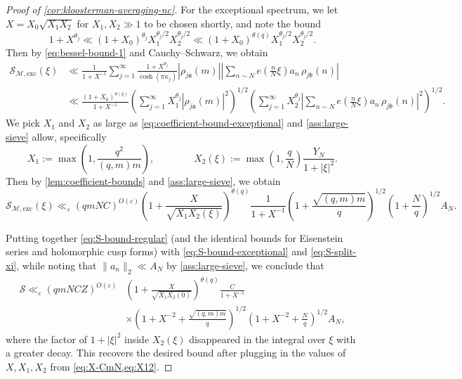 \documentclass[reqno,11pt]{amsart}
\theoremstyle{remark}
\numberwithin{equation}{section}
\newcommand{\mM}{\mathcal{M}}
\newcommand{\mS}{\mathcal{S}}
\newcommand{\ma}{\mathfrak{a}}
\newcommand{\mb}{\mathfrak{b}}
\newcommand{\eps}{\varepsilon}
\begin{document}
\begin{proof}[Proof of \cref{cor:kloosterman-averaging-nc}]
For the exceptional spectrum, we let $X = X_0 \sqrt{X_1 X_2}$ for $X_1, X_2 \gg 1$ to be chosen shortly, and note the bound
\[
    1 + X^{\theta_j} \ll (1 + X_0)^{\theta_j} X_1^{\theta_j/2} X_2^{\theta_j/2} 
    \ll 
    (1 + X_0)^{\theta(q)} X_1^{\theta_j/2} X_2^{\theta_j/2}.
\]
Then by \cref{eq:bessel-bound-1} and Cauchy--Schwarz, we obtain
\begin{equation} \label{eq:exceptional-contribution}
\begin{aligned}
    \mS_{\mM,\text{exc}}(\xi)
    &\ll 
    \frac{1}{1+X^{-1}}
    \sum_{j=1}^\infty \frac{1 + X^{\theta_j}}{\cosh(\pi \kappa_j)} 
    |\rho_{j\ma}(m)| \left\vert \sum_{n \sim N} e\left(\frac{n}{N} \xi\right) a_n\, 
    \rho_{j\mb}(n)\right\vert
    \\
    &\ll
    \frac{(1 + X_0)^{\theta(q)}}{1+X^{-1}}
    \left(
    \sum_{j=1}^\infty X_1^{\theta_j} 
    |\rho_{j\ma}(m)|^2 \right)^{1/2}
    \left( 
    \sum_{j=1}^\infty X_2^{\theta_j} \left\vert \sum_{n \sim N} e\left(\frac{n}{N} \xi\right) a_n\,  
    \rho_{j\mb}(n)\right\vert^2 \right)^{1/2}.
\end{aligned}
\end{equation}
We pick $X_1$ and $X_2$ as large as \cref{eq:coefficient-bound-exceptional} and \cref{ass:large-sieve} allow, specifically
\begin{equation} \label{eq:X12}
    X_1 := \max\left(1, \frac{q^2}{(q,m) m}\right),
    \qquad\qquad 
    X_2(\xi) := \max\left(1, \frac{q}{N}\right) \frac{Y_N}{1 + |\xi|^2}.
\end{equation}
Then by \cref{lem:coefficient-bounds} and \cref{ass:large-sieve}, we obtain
\begin{equation} \label{eq:S-bound-exceptional}
    \mS_{\mM,\text{exc}}(\xi)
    \ll_\eps 
    (qmNC)^{O(\eps)}
    \left(1 + \frac{X}{\sqrt{X_1 X_2(\xi)}} \right)^{\theta(q)}
    \frac{1}{1+X^{-1}} \left(1 + \frac{\sqrt{(q,m)m}}{q} \right)^{1/2}
    \left(1 + \frac{N}{q}\right)^{1/2} A_N.
\end{equation}

Putting together \cref{eq:S-bound-regular} (and the identical bounds for Eisenstein series and holomorphic cusp forms) with \cref{eq:S-bound-exceptional} and \cref{eq:S-split-xi}, while noting that $\|a_n\|_2 \ll A_N$ by \cref{ass:large-sieve}, we conclude that
\begin{equation} \label{eq:S-final-bound}
\begin{aligned}
    \mS \ll_\eps (qmNCZ)^{O(\eps)}
    &\left(1 + \frac{X}{\sqrt{X_1 X_2(0)}} \right)^{\theta(q)}
    \frac{C}{1+X^{-1}} 
    \\
    &\times 
    \left(1 + X^{-2} +\frac{\sqrt{(q,m)m}}{q} \right)^{1/2}
    \left(1 + X^{-2} + \frac{N}{q}\right)^{1/2} A_N,
\end{aligned}
\end{equation}
where the factor of $1 + |\xi|^2$ inside $X_2(\xi)$ disappeared in the integral over $\xi$ with a greater decay.
This recovers the desired bound after plugging in the values of $X, X_1, X_2$ from \cref{eq:X-CmN,eq:X12}.
\end{proof}
\end{document}
